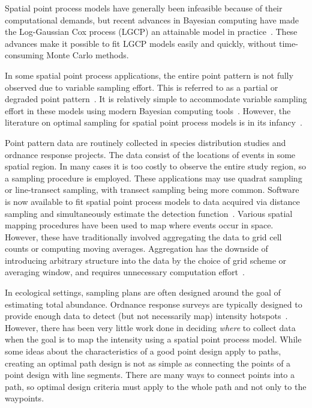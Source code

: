 \documentclass[review]{elsarticle}
\begin{document}
Spatial point process models have generally been infeasible because of their
computational demands, but recent advances in Bayesian computing have made the
Log-Gaussian Cox process (LGCP) an attainable model in
practice~\citep{rueetal,lindgrenetal,illianetal,simpsonetal}. These advances
make it possible to fit LGCP models easily and quickly, without time-consuming
Monte Carlo methods.

In some spatial point process applications, the entire point pattern is not
fully observed due to variable sampling effort. This is referred to as a
partial or degraded point pattern~\citep{chakrabortyetal}. It is relatively
simple to accommodate variable sampling effort in these models using modern
Bayesian computing tools~\citep{yuanetal}. However, the literature on optimal
sampling for spatial point process models is in its
infancy~\citep{liuvanhatalo}.

Point pattern data are routinely collected in species distribution studies and
ordnance response projects. The data consist of the locations of events in some
spatial region. In many cases it is too costly to observe the entire study
region, so a sampling procedure is employed. These applications may use quadrat
sampling or line-transect sampling, with transect sampling being more common.
Software is now available to fit spatial point process models to data acquired
via distance sampling and simultaneously estimate the detection
function~\citep{dspat,baser}. Various spatial mapping procedures have been used
to map where events occur in space. However, these have traditionally involved
aggregating the data to grid cell counts or computing moving averages.
Aggregation has the downside of introducing arbitrary structure into the data
by the choice of grid scheme or averaging window, and requires unnecessary
computation effort~\citep{simpsonetal}.

In ecological settings, sampling plans are often designed around the goal of
estimating total abundance. Ordnance response surveys are typically designed
to provide enough data to detect (but not necessarily map) intensity
hotspots~\citep{em200-1-15,flaggetal}. However, %
there has been very little work done in deciding \emph{where} to collect data
when the goal is to map the intensity using a spatial point process model.
While some ideas about the characteristics of a good point design apply to
paths, creating an optimal path design is not as simple as connecting the
points of a point design with line segments. There are many ways to connect
points into a path, so optimal design criteria must apply to the whole path and
not only to the waypoints.
\end{document}
